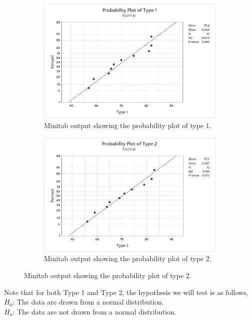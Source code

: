 \documentclass{article}
\begin{document}
\begin{figure}[h]
    \centering
    \begin{subfigure}[b]{0.4\textwidth}
        \includegraphics[width=1.25\textwidth]{./images/3_c_1.png}
        \caption{Minitab output showing the probability plot of type 1.}
      \label{fig:img1}
    \end{subfigure}
    \hfill
    \begin{subfigure}[b]{0.4\textwidth}
        \includegraphics[width=1.25\textwidth]{./images/3_c_2.png}
        \caption{Minitab output showing the probability plot of type 2.}
      \label{fig:img2}
    \end{subfigure}
    \label{fig:both}
  \end{figure}

  Note that for both Type 1 and Type 2, the hypothesis we will test is as follows, \\
  $H_0$: The data are drawn from a normal distribution. \\
  $H_a$: The data are not drawn from a normal distribution. 
\end{document}
